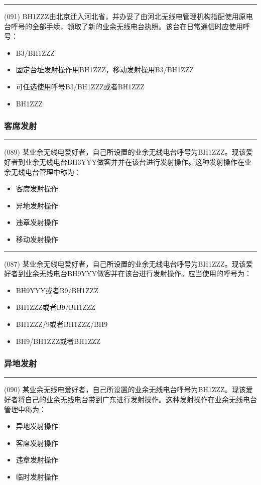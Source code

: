 \documentclass[twocolumn,hyperref,UTF8]{ctexart}  %
\begin{document}
\noindent\rule{0.5\textwidth}{1pt}
\heiti (091) BH1ZZZ由北京迁入河北省，并{\color{cyan}办妥}了由河北无线电管理机构指配{\color{cyan}使用原电台呼号}的全部手续，领取了新的业余无线电台执照。该台在日常通信时应使用呼号： \songti {\color{gray} [LK0093] }
\begin{itemize}
	\item  B3/BH1ZZZ
	\item  固定台址发射操作用BH1ZZZ，移动发射操用B3/BH1ZZZ
	\item  可任选使用呼号B3/BH1ZZZ或者BH1ZZZ
	\item  BH1ZZZ
\end{itemize}


\subsubsection{客席发射}


\noindent\rule{0.5\textwidth}{1pt}
\heiti (089) 某业余无线电爱好者，自己所设置的业余无线电台呼号为BH1ZZZ。现该爱好者到业余无线电台BH3YYY{\color{cyan}做客并并在该台进行发射操作}。这种发射操作在业余无线电台管理中称为： \songti {\color{gray} [LK0087] }
\begin{itemize}
	\item  客席发射操作
	\item  异地发射操作
	\item  违章发射操作
	\item  移动发射操作
\end{itemize}


\noindent\rule{0.5\textwidth}{1pt}
\heiti (087) 某业余无线电爱好者，自己所设置的业余无线电台呼号为BH1ZZZ。现该爱好者到业余无线电台BH9YYY{\color{cyan}做客并在该台进行发射操作}。应当使用的呼号为： \songti {\color{gray} [LK0084] }
\begin{itemize}
	\item  BH9YYY或者B9/BH1ZZZ
	\item  BH1ZZZ或者B9/BH1ZZZ
	\item  BH1ZZZ/9或者BH1ZZZ/BH9
	\item  BH9/BH1ZZZ或者BH1ZZZ
\end{itemize}


\subsubsection{异地发射}


\noindent\rule{0.5\textwidth}{1pt}
\heiti (090) 某业余无线电爱好者，自己所设置的业余无线电台呼号为BH1ZZZ。现该爱好者将自己的业余无线{\color{cyan}电台带到}广东进行发射操作。这种发射操作在业余无线电台管理中称为： \songti {\color{gray} [LK0088] }
\begin{itemize}
	\item  异地发射操作
	\item  客席发射操作
	\item  违章发射操作
	\item  临时发射操作
\end{itemize}
\end{document}
